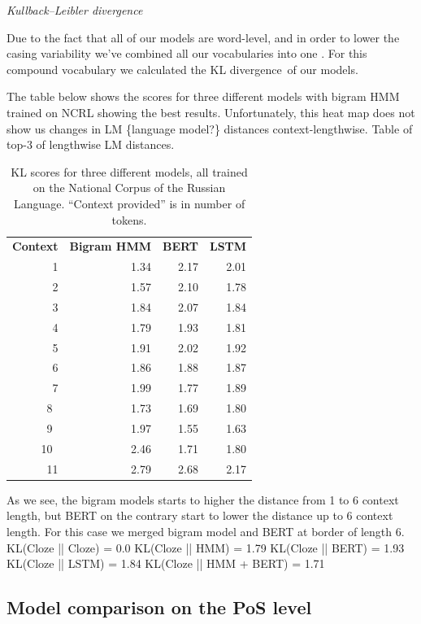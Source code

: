 \documentclass[a4paper]{article}
\newcommand{\head}[1]{\vspace{0.5em}\emph{#1}\vspace{0.25em}}
\begin{document}
\head{Kullback–Leibler divergence} %

Due to the fact that all of our models are word-level, and in order to lower the casing variability we've combined all our vocabularies into one
. For this compound vocabulary we calculated the KL divergence of our models.

The table below shows the scores for three different models with
bigram HMM trained on NCRL showing the best results. Unfortunately,
this heat map does not show us changes in LM \{language model?\} distances context-lengthwise. Table of top-3 of lengthwise LM distances.

\begin{table}
\centering

\caption{KL scores for three different models, all trained on the
National Corpus of the Russian Language. ``Context provided'' is in number
of tokens.}

\begin{tabular}{rrrr}
\textbf{Context} &
\textbf{Bigram HMM} &
\textbf{BERT} &
\textbf{LSTM} \\
1 &
1.34 &
2.17 &
2.01 \\
2 &
1.57 &
2.10 &
1.78 \\
3 &
1.84 &
2.07 &
1.84 \\
4 &
1.79 &
1.93 &
1.81 \\
5 &
1.91 &
2.02 &
1.92 \\
6 &
1.86 &
1.88 &
1.87 \\
7 &
1.99 &
1.77 &
1.89 \\
8 &
1.73 &
1.69 &
1.80 \\
9 &
1.97 &
1.55 &
1.63 \\
10 &
2.46 &
1.71 &
1.80 \\
11 &
2.79 &
2.68 &
2.17
\end{tabular}
\end{table}

As we see, the bigram models starts to higher the distance from 1 to 6 context length, but BERT on the contrary start to lower the distance up to 6 context length. For this case we merged bigram model and BERT at border of length 6.
KL(Cloze || Cloze) = 0.0
KL(Cloze || HMM) = 1.79
KL(Cloze || BERT) = 1.93
KL(Cloze || LSTM) = 1.84
KL(Cloze || HMM + BERT) = 1.71

\subsection{Model comparison on the PoS level} %
\end{document}
